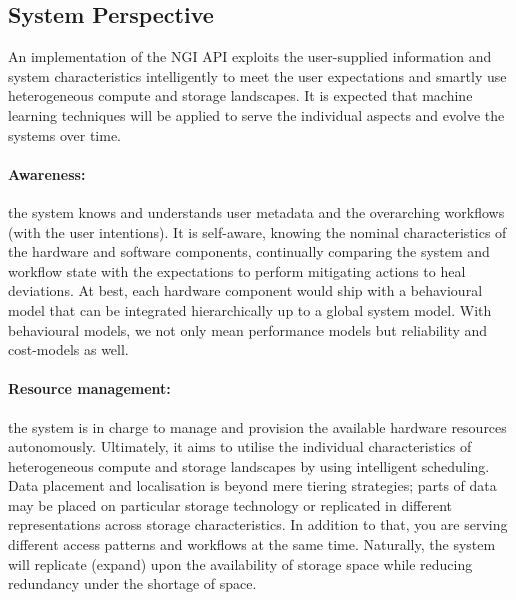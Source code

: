 \documentclass[a4paper, twocolumn]{article}
\begin{document}
\subsection{System Perspective}

An implementation of the NGI API exploits the user-supplied information and system characteristics intelligently to meet the user expectations and smartly use heterogeneous compute and storage landscapes.
It is expected that machine learning techniques will be applied to serve the individual aspects and evolve the systems over time.

\paragraph{Awareness:}
the system knows and understands user metadata and the overarching workflows (with the user intentions).
It is self-aware, knowing the nominal characteristics of the hardware and software components, continually comparing the system and workflow state with the expectations to perform mitigating actions to heal deviations.
At best, each hardware component would ship with a behavioural model that can be integrated hierarchically up to a global system model.
With behavioural models, we not only mean performance models but reliability and cost-models as well.

\paragraph{Resource management:}
the system is in charge to manage and provision the available hardware resources autonomously.
Ultimately, it aims to utilise the individual characteristics of heterogeneous compute and storage landscapes by using intelligent scheduling.
Data placement and localisation is beyond mere tiering strategies; parts of data may be placed on particular storage technology or replicated in different representations across storage characteristics.
In addition to that, you are serving different access patterns and workflows at the same time.
Naturally, the system will replicate (expand) upon the availability of storage space while reducing redundancy under the shortage of space.
\end{document}
